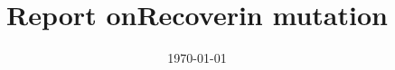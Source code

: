 \documentclass[a4wide]{article}
\title{Report onRecoverin mutation} \\
\date{\today}
\begin{document}
\maketitle
\begin{figure}[h]
\caption{ }
\label{fig:example}
\end{figure}
\end{document}
